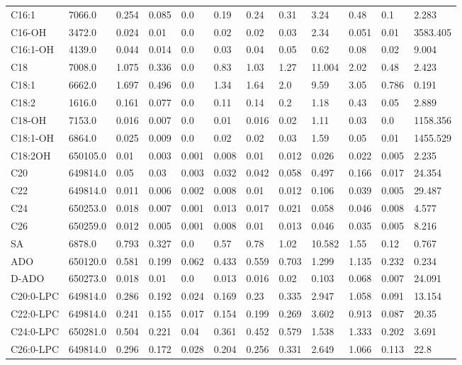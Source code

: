 \begin{tabular}{|l|l|l|l|l|l|l|l|l|l|l|l|}
C16:1 & 7066.0 & 0.254 & 0.085 & 0.0 & 0.19 & 0.24 & 0.31 & 3.24 & 0.48 & 0.1 & 2.283 \\
C16-OH & 3472.0 & 0.024 & 0.01 & 0.0 & 0.02 & 0.02 & 0.03 & 2.34 & 0.051 & 0.01 & 3583.405 \\
C16:1-OH & 4139.0 & 0.044 & 0.014 & 0.0 & 0.03 & 0.04 & 0.05 & 0.62 & 0.08 & 0.02 & 9.004 \\
C18 & 7008.0 & 1.075 & 0.336 & 0.0 & 0.83 & 1.03 & 1.27 & 11.004 & 2.02 & 0.48 & 2.423 \\
C18:1 & 6662.0 & 1.697 & 0.496 & 0.0 & 1.34 & 1.64 & 2.0 & 9.59 & 3.05 & 0.786 & 0.191 \\
C18:2 & 1616.0 & 0.161 & 0.077 & 0.0 & 0.11 & 0.14 & 0.2 & 1.18 & 0.43 & 0.05 & 2.889 \\
C18-OH & 7153.0 & 0.016 & 0.007 & 0.0 & 0.01 & 0.016 & 0.02 & 1.11 & 0.03 & 0.0 & 1158.356 \\
C18:1-OH & 6864.0 & 0.025 & 0.009 & 0.0 & 0.02 & 0.02 & 0.03 & 1.59 & 0.05 & 0.01 & 1455.529 \\
C18:2OH & 650105.0 & 0.01 & 0.003 & 0.001 & 0.008 & 0.01 & 0.012 & 0.026 & 0.022 & 0.005 & 2.235 \\
C20 & 649814.0 & 0.05 & 0.03 & 0.003 & 0.032 & 0.042 & 0.058 & 0.497 & 0.166 & 0.017 & 24.354 \\
C22 & 649814.0 & 0.011 & 0.006 & 0.002 & 0.008 & 0.01 & 0.012 & 0.106 & 0.039 & 0.005 & 29.487 \\
C24 & 650253.0 & 0.018 & 0.007 & 0.001 & 0.013 & 0.017 & 0.021 & 0.058 & 0.046 & 0.008 & 4.577 \\
C26 & 650259.0 & 0.012 & 0.005 & 0.001 & 0.008 & 0.01 & 0.013 & 0.046 & 0.035 & 0.005 & 8.216 \\
SA & 6878.0 & 0.793 & 0.327 & 0.0 & 0.57 & 0.78 & 1.02 & 10.582 & 1.55 & 0.12 & 0.767 \\
ADO & 650120.0 & 0.581 & 0.199 & 0.062 & 0.433 & 0.559 & 0.703 & 1.299 & 1.135 & 0.232 & 0.234 \\
D-ADO & 650273.0 & 0.018 & 0.01 & 0.0 & 0.013 & 0.016 & 0.02 & 0.103 & 0.068 & 0.007 & 24.091 \\
C20:0-LPC & 649814.0 & 0.286 & 0.192 & 0.024 & 0.169 & 0.23 & 0.335 & 2.947 & 1.058 & 0.091 & 13.154 \\
C22:0-LPC & 649814.0 & 0.241 & 0.155 & 0.017 & 0.154 & 0.199 & 0.269 & 3.602 & 0.913 & 0.087 & 20.35 \\
C24:0-LPC & 650281.0 & 0.504 & 0.221 & 0.04 & 0.361 & 0.452 & 0.579 & 1.538 & 1.333 & 0.202 & 3.691 \\
C26:0-LPC & 649814.0 & 0.296 & 0.172 & 0.028 & 0.204 & 0.256 & 0.331 & 2.649 & 1.066 & 0.113 & 22.8 \\

\end{tabular}
